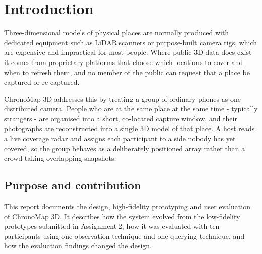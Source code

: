 
\section{Introduction}

Three-dimensional models of physical places are normally produced with dedicated equipment such as
LiDAR scanners or purpose-built camera rigs, which are expensive and impractical for most people.
Where public 3D data does exist it comes from proprietary platforms that choose which locations to
cover and when to refresh them, and no member of the public can request that a place be captured or
re-captured.

ChronoMap 3D addresses this by treating a group of ordinary phones as one distributed camera.
People who are at the same place at the same time - typically strangers - are organised into a
short, co-located capture window, and their photographs are reconstructed into a single 3D model of
that place. A host reads a live coverage radar and assigns each participant to a side nobody has yet
covered, so the group behaves as a deliberately positioned array rather than a crowd taking
overlapping snapshots.



\subsection{Purpose and contribution}

This report documents the design, high-fidelity prototyping and user evaluation of ChronoMap 3D. It
describes how the system evolved from the low-fidelity prototypes submitted in Assignment 2, how it
was evaluated with ten participants using one observation technique and one querying technique, and
how the evaluation findings changed the design.

